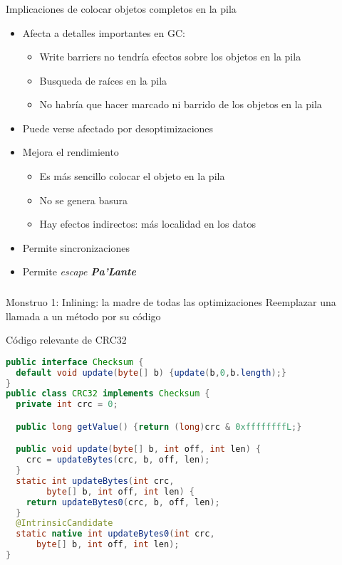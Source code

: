 \begin{frame}[fragile]
  \frametitle{\ft}
  \begin{block}{Implicaciones de colocar objetos completos en la pila}
    \begin{itemize}
    \item Afecta a detalles importantes en GC:
      \begin{itemize}
      \item Write barriers no tendría efectos sobre los objetos en la pila
      \item Busqueda de raíces en la pila
      \item No habría que hacer marcado ni barrido de los objetos en la pila
      \end{itemize}
    \item Puede verse afectado por desoptimizaciones
    \item Mejora el rendimiento
      \begin{itemize}
      \item Es más sencillo colocar el objeto en la pila
      \item No se genera basura
      \item Hay efectos indirectos: más localidad en los datos
      \end{itemize}
    \item Permite sincronizaciones
    \item Permite {\it escape {\bfseries Pa'Lante}}
    \end{itemize}
  \end{block}
\end{frame}


\begin{frame}[fragile]
  \frametitle{\ft}
  \begin{block}{Monstruo 1: Inlining: la madre de todas las optimizaciones}
    Reemplazar una llamada a un método por su código
  \end{block}
\end{frame}

\begin{frame}[fragile]
  \begin{block}{Código relevante de CRC32}
    \begin{lstlisting}[language=java]
public interface Checksum {
  default void update(byte[] b) {update(b,0,b.length);}
}
public class CRC32 implements Checksum {
  private int crc = 0;

  public long getValue() {return (long)crc & 0xffffffffL;}

  public void update(byte[] b, int off, int len) {
    crc = updateBytes(crc, b, off, len);
  }
  static int updateBytes(int crc,
        byte[] b, int off, int len) {
    return updateBytes0(crc, b, off, len);
  }
  @IntrinsicCandidate
  static native int updateBytes0(int crc,
      byte[] b, int off, int len);
}
    \end{lstlisting}
  \end{block}
\end{frame}

